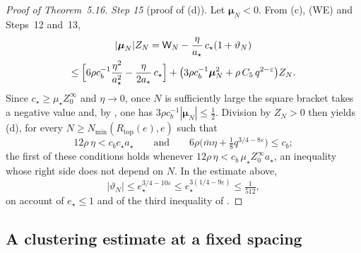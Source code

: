 \documentclass[11pt]{amsart}
\theoremstyle{definition}
\begin{document}
\begin{proof}[Proof of Theorem~5.16]
\emph{Step 15} (proof of (d)).
Let $\boldsymbol\mu_N<0$.
From (c), (WE) and Steps~12 and~13,
\begin{multline*}
|\boldsymbol\mu_N|Z_N=\mathsf W_N-\frac\eta{a_\star}\,c_\star(1+\vartheta_N)\\
\le\Bigl[6\rho c_b^{-1}\frac{\eta^2}{a_\star^2}-\frac\eta{2a_\star}\,c_\star\Bigr]+\bigl(3\rho c_b^{-1}\boldsymbol\mu_N^2+\rho\,C_5\,q^{2-\varepsilon}\bigr)Z_N .
\end{multline*}
Since $c_\star\ge\mu_\star Z_0^\infty$ and $\eta\to0$, once $N$ is sufficiently large the square bracket takes a negative value and, by \cite[Proposition~28.3\,(d)]{QEDIII}, one has $3\rho c_b^{-1}|\boldsymbol\mu_N|\le\frac12$.
Division by $Z_N>0$ then yields (d), for every $N\ge N_{\min}(R_{\mathrm{top}}(e),e)$ such that
\begin{equation*}
12\rho\,\eta<c_bc_\star a_\star\qquad\text{and}\qquad6\rho\bigl(\bar m\eta+\tfrac18q^{3/4-8\varepsilon}\bigr)\le c_b ;
\end{equation*}
the first of these conditions holds whenever $12\rho\,\eta<c_b\,\mu_\star Z_0^\infty a_\star$, an inequality whose right side does not depend on $N$.
In the estimate above,
\begin{equation*}
|\vartheta_N|\le e_\star^{3/4-10\varepsilon}\le e_\star^{3(1/4-9\varepsilon)}\le\tfrac1{512},
\end{equation*}
on account of $e_\star\le1$ and of the third inequality of \cite[(T2)]{QEDIII}.
\end{proof}


\subsection{A clustering estimate at a fixed spacing}
\end{document}
